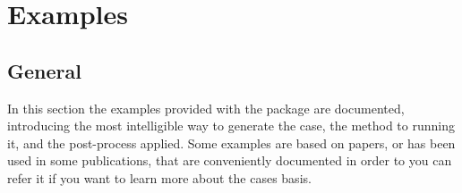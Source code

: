 \chapter{Examples}
\label{s:examples}
%
\section{General}
%
In this section the examples provided with the \NAME package are documented, introducing the most intelligible
way to generate the case, the method to running it, and the post-process applied. \rc
%
Some examples are based on papers, or has been used in some publications, that are conveniently documented in
order to you can refer it if you want to learn more about the cases basis.
%

%

%
